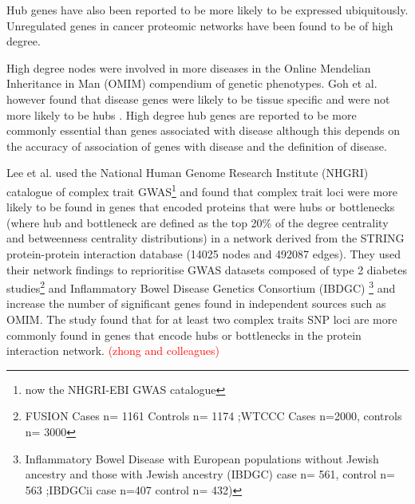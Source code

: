 Hub genes have also been reported to be more likely to be expressed ubiquitously\cite{goh2007human}. Unregulated genes in cancer proteomic networks have been found to be of high degree\cite{wachi2005interactome}. 

 High degree nodes were involved in more diseases in the Online Mendelian Inheritance in Man (OMIM) compendium of genetic phenotypes\cite{xu2006discovering}. Goh et al. however found that disease genes were likely to be tissue specific and were not more likely to be hubs \cite{goh2007human}.  High degree hub genes are reported to be more commonly essential than genes associated with disease\cite{barabasi2011network} although this depends on the accuracy of association of genes with disease and the definition of disease. 

Lee et al.\cite{lee2013network} used the National Human Genome Research Institute (NHGRI)  catalogue of complex trait GWAS\footnote{now the NHGRI-EBI GWAS catalogue} and found that complex trait loci were more likely to be found in genes that encoded proteins that were hubs or bottlenecks (where hub and bottleneck are defined as the top 20\% of the degree centrality and betweenness centrality distributions) in a network derived from the STRING protein-protein interaction database (14025 nodes and 492087 edges). They used their network findings to reprioritise GWAS datasets composed of type 2 diabetes studies\footnote{ FUSION  Cases n=	1161 Controls n=	1174 ;WTCCC Cases n=2000, controls n= 3000 } and Inflammatory Bowel Disease Genetics Consortium (IBDGC) \footnote{Inflammatory Bowel Disease   with European populations without Jewish ancestry and those with Jewish ancestry (IBDGC) case n=	561, control n=	563 ;IBDGCii case n=407 control n=	432)} and increase the number of significant genes found in independent sources such as OMIM\cite{hamosh2005online}.  The study found that for at least two complex traits SNP loci are more commonly found in genes that encode hubs or bottlenecks in the protein interaction network. 
\textcolor{red}{(zhong and colleagues)}\cite{zhong2013prediction}



